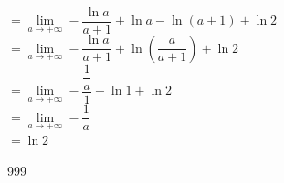 \documentclass[a4paper]{article}
\begin{document}
$= \lim\limits_{a\to+\infty} -\dfrac{\ln{a}}{a+1}+\ln{a} - \ln\left({a+1}\right) +\ln{2}$\\

$= \lim\limits_{a\to+\infty} -\dfrac{\ln{a}}{a+1}+\ln\left({\dfrac{a}{a+1}}\right) + \ln2$\\

$= \lim\limits_{a\to+\infty} -\dfrac{\dfrac{1}{a}}{1} + \ln1 + \ln2$\\

$= \lim\limits_{a\to+\infty} -\dfrac{1}{a}$\\

$=\ln2$\\


\begin{thebibliography}{999}
\end{thebibliography}
\end{document}
